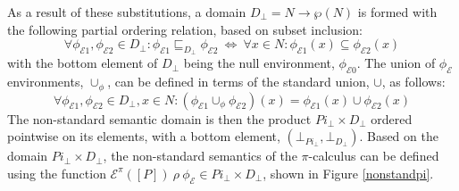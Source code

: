 \documentclass[10pt,a4paper,final,oneside,fleqn]{book}
\begin{document}
As a result of these substitutions, a domain $D_\bot=N\to\wp(N)$ is formed with the following partial ordering relation, based on subset inclusion:
\[\forall\phi_{\mathcal{E}1},\phi_{\mathcal{E}2}\in D_\bot:\phi_{\mathcal{E}1}\sqsubseteq_{D_\bot}\phi_{\mathcal{E}2}~\Leftrightarrow~\forall x\in N:\phi_{\mathcal{E}1}(x)\subseteq\phi_{\mathcal{E}2}(x)\]
with the bottom element of $D_\bot$ being the null environment, $\phi_{\mathcal{E}0}$.  The union of $\phi_\mathcal{E}$ environments, $\cup_\phi$, can be defined in terms of the standard union, $\cup$, as follows:
\[\forall\phi_{\mathcal{E}1},\phi_{\mathcal{E}2}\in D_\bot,x\in N: (\phi_{\mathcal{E}1}\cup_\phi\phi_{\mathcal{E}2})(x)=\phi_{\mathcal{E}1}(x)\cup\phi_{\mathcal{E}2}(x)\]
The non-standard semantic domain is then the product $Pi_\bot\times D_\bot$ ordered pointwise on its elements, with a bottom element, $(\bot_{Pi_\bot},\bot_{D_\bot})$.  Based on the domain $Pi_\bot\times D_\bot$, the non-standard semantics of the $\pi$-calculus can be defined using the function $\mathcal{E}^{\pi}(\![P]\!)~\rho~\phi_\mathcal{E}\in Pi_\bot\times D_\bot$, shown in Figure \ref{nonstandpi}.
\end{document}
